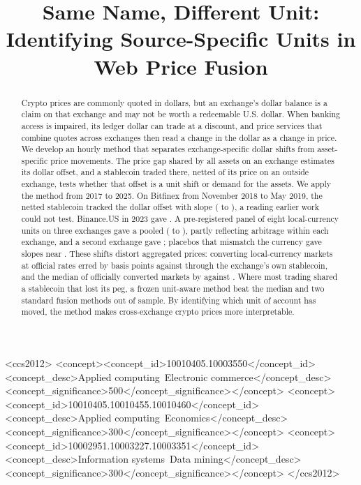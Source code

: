 \documentclass[sigconf,review,anonymous]{acmart}
\begin{document}
\title{Same Name, Different Unit: Identifying Source-Specific Units in Web Price Fusion}

\begin{abstract}
Crypto prices are commonly quoted in dollars, but an exchange's dollar balance is a claim on that exchange and may not
be worth a redeemable U.S. dollar. When banking access is impaired, its ledger dollar can trade at a discount, and price
services that combine quotes across exchanges then read a change in the dollar as a change
in price. We develop an hourly method that separates exchange-specific dollar shifts from asset-specific price movements.
The price gap shared by all assets on an exchange estimates its dollar offset, and a
stablecoin traded there, netted of its price on an outside exchange, tests whether that offset is a unit shift or demand
for the assets.
We apply the method from 2017 to 2025. On Bitfinex from November 2018 to May 2019, the netted stablecoin tracked the
dollar offset with slope \NumKStressDaySlopeAdj{} (\NumKStressDaySlopeAdjMoLo{} to
\NumKStressDaySlopeAdjMoHi{}), a reading earlier work could not test. Binance.US in 2023 gave
\NumUAnchorBnusSlope{}. A pre-registered panel of eight local-currency units on three exchanges gave a pooled
\NumPNPooledStressLam{} (\NumPNPooledStressLo{} to \NumPNPooledStressHi{}), partly reflecting arbitrage within each
exchange, and a second exchange gave \NumPKPooledStressLam{}; placebos that mismatch the currency gave slopes near
\NumEXPlaceboStressPairMedian{}. These shifts distort aggregated prices: converting local-currency markets at official rates
erred by \NumPFMaeO{} basis points against \NumPFMaeA{} through the exchange's own stablecoin, and the median of
officially converted markets by \NumPFFusMOMae{} against \NumPFFusMAMae{}. Where most trading shared a stablecoin that
lost its peg, a frozen unit-aware method beat the median and two standard fusion methods out of sample. By identifying which unit of account has moved, the method makes cross-exchange crypto prices more interpretable.
\end{abstract}

\begin{CCSXML}
<ccs2012>
<concept><concept_id>10010405.10003550</concept_id><concept_desc>Applied computing~Electronic commerce</concept_desc><concept_significance>500</concept_significance></concept>
<concept><concept_id>10010405.10010455.10010460</concept_id><concept_desc>Applied computing~Economics</concept_desc><concept_significance>300</concept_significance></concept>
<concept><concept_id>10002951.10003227.10003351</concept_id><concept_desc>Information systems~Data mining</concept_desc><concept_significance>300</concept_significance></concept>
</ccs2012>
\end{CCSXML}
\end{document}

